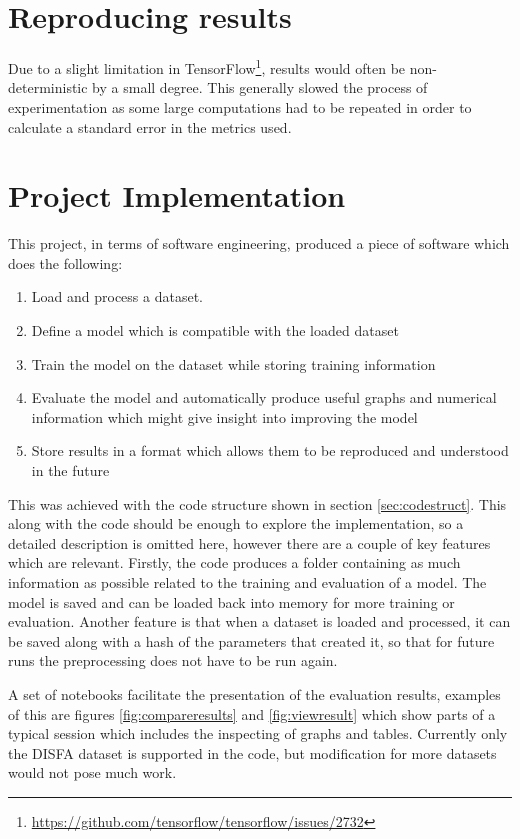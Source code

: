   \section{Reproducing results} \label{sec:GPU}
    Due to a slight limitation in TensorFlow\footnote{\url{https://github.com/tensorflow/tensorflow/issues/2732}}, results would often be non-deterministic by a small degree. This generally slowed
    the process of experimentation as some large computations had to be repeated in order to calculate a standard error in the metrics used.
  \section{Project Implementation}
    This project, in terms of software engineering, produced a piece of software which does the following:
    \begin{enumerate}
      \item Load and process a dataset.
      \item Define a model which is compatible with the loaded dataset
      \item Train the model on the dataset while storing training information
      \item Evaluate the model and automatically produce useful graphs and numerical information which might give insight into improving the model
      \item Store results in a format which allows them to be reproduced and understood in the future
    \end{enumerate}

    This was achieved with the code structure shown in section
    \ref{sec:codestruct}. This along with the code should be enough to explore
    the implementation, so a detailed description is omitted here, however there
    are a couple of key features which are relevant. Firstly, the code produces
    a folder containing as much information as possible related to the training
    and evaluation of a model. The model is saved and can be loaded back into
    memory for more training or evaluation. Another feature is that when a
    dataset is loaded and processed, it can be saved along with a hash of the
    parameters that created it, so that for future runs the preprocessing does
    not have to be run again.

    A set of notebooks facilitate the presentation of the evaluation results,
    examples of this are figures \ref{fig:compareresults} and
    \ref{fig:viewresult} which show parts of a typical session which includes
    the inspecting of graphs and tables. Currently only the DISFA dataset is
    supported in the code, but modification for more datasets would not pose
    much work.



